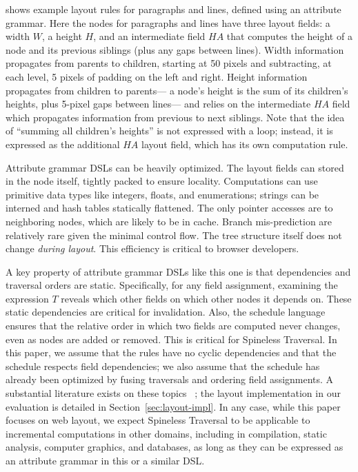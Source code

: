  shows
  example layout rules for paragraphs and lines,
  defined using an attribute grammar.
Here the nodes for paragraphs and lines have three layout fields:
  a width $W$, a height $H$, and an intermediate field $HA$
  that computes the height of a node and its previous siblings
  (plus any gaps between lines).
Width information propagates from parents to children,
  starting at 50 pixels and subtracting, at each level,
  5 pixels of padding on the left and right.
Height information propagates from children to parents---%
  a node's height is the sum of its children's heights,
  plus 5-pixel gaps between lines---%
  and relies on the intermediate $HA$ field
  which propagates information from previous to next siblings.
Note that the idea of ``summing all children's heights''
  is not expressed with a loop;
  instead, it is expressed as the additional $HA$ layout field,
  which has its own computation rule.

Attribute grammar DSLs can be heavily optimized.
The layout fields can stored in the node itself,
  tightly packed to ensure locality.
Computations can use primitive data types
  like integers, floats, and enumerations;
  strings can be interned and hash tables statically flattened.
The only pointer accesses are to neighboring nodes,
  which are likely to be in cache.
Branch mis-prediction are relatively rare
  given the minimal control flow.
The tree structure itself does not change \emph{during layout}.
This efficiency is critical to browser developers.

A key property of attribute grammar DSLs like this one
  is that dependencies and traversal orders are static.
Specifically, for any field assignment,
  examining the expression $T$ reveals
  which other fields on which other nodes it depends on.
These static dependencies are critical for invalidation.
Also, the schedule language ensures that
  the relative order in which two fields are computed
  never changes, even as nodes are added or removed.
This is critical for Spineless Traversal.
In this paper, we assume
  that the rules have no cyclic dependencies
  and that the schedule
  respects field dependencies;
  we also assume that the schedule has already been optimized
  by fusing traversals and ordering field assignments.
A substantial literature exists on these topics~%
  \cite{grafter,yufeng-1,yufeng-2};
  the layout implementation in our evaluation
  is detailed in Section~\ref{sec:layout-impl}.
In any case, while this paper focuses on web layout,
  we expect Spineless Traversal to be applicable
  to incremental computations in other domains,
  including in compilation, static analysis,
  computer graphics, and databases,
  as long as they can be expressed as an attribute grammar
  in this or a similar DSL.